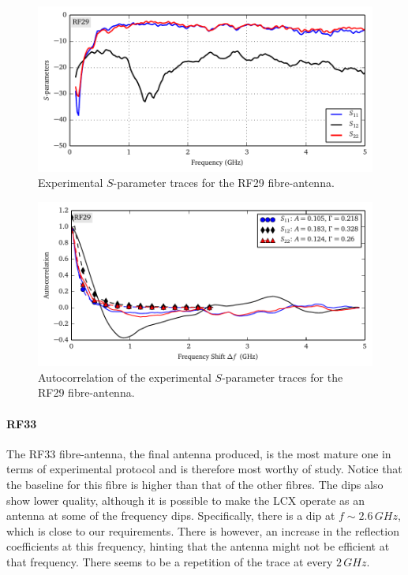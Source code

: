 \begin{figure}
 \centering
 \includegraphics{figs/active/RF29-sParameters.pdf}
 \caption[Experimental $S$-parameter traces for the RF29 fibre-antenna]
 		{Experimental $S$-parameter traces for the RF29 fibre-antenna.}
 \label{fig:active.lcx.rf29sParameters}
\end{figure}

\begin{figure}
 \centering
 \includegraphics{figs/active/RF29-autoCorrelation.pdf}
 \caption[Autocorrelation of the experimental $S$-parameter traces for the RF29 fibre-antenna]
 		{Autocorrelation of the experimental $S$-parameter traces for the RF29 fibre-antenna.}
 \label{fig:active.lcx.rf29autocorrelation}
\end{figure}

\paragraph{RF33}
The RF33 fibre-antenna, the final antenna produced, is the most mature
one in terms of experimental protocol and is therefore most
worthy of study. Notice that the baseline for this fibre is 
higher than that of the other fibres. The dips also show lower quality,
although it is possible to make the LCX operate as an antenna
at some of the frequency dips. Specifically, there is a dip at
$f\sim2.6\,\unit{GHz}$, which is close to our requirements. 
There is however, an increase in the reflection coefficients
at this frequency, hinting that the antenna might not be 
efficient at that frequency. There seems to be a repetition 
of the trace at every $2\,\unit{GHz}$. 

